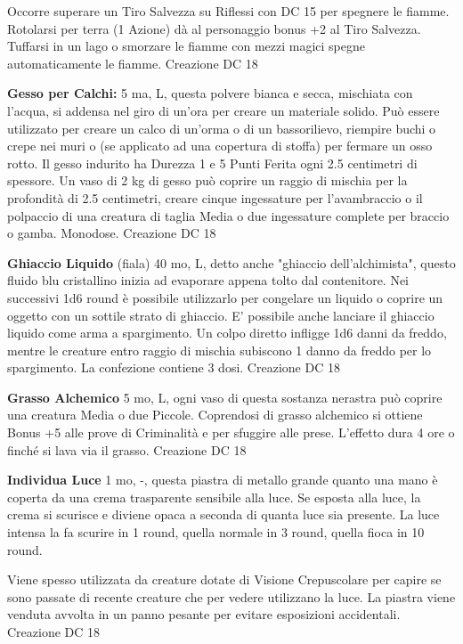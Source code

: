 \documentclass[a4paper,11pt,twoside,openany]{book}
\begin{document}
Occorre superare un Tiro Salvezza su Riflessi con DC 15 per spegnere le fiamme. Rotolarsi per terra (1 Azione) dà al personaggio bonus +2 al Tiro Salvezza. Tuffarsi in un lago o smorzare le fiamme con mezzi magici spegne automaticamente le fiamme. Creazione DC 18

\textbf{Gesso per Calchi:} 5 ma, L, questa polvere bianca e secca, mischiata con l’acqua, si addensa nel giro di un’ora per creare un materiale solido. Può essere utilizzato per creare un calco di un’orma o di un bassorilievo, riempire buchi o crepe nei muri o (se applicato ad una copertura di stoffa) per fermare un osso rotto. Il gesso indurito ha Durezza 1 e 5 Punti Ferita ogni 2.5 centimetri di spessore. Un vaso di 2 kg di gesso può coprire un raggio di mischia per la profondità di 2.5 centimetri, creare cinque ingessature per l’avambraccio o il polpaccio di una creatura di taglia Media o due ingessature complete per braccio o gamba. Monodose. Creazione DC 18

\textbf{Ghiaccio Liquido} (fiala) 40 mo, L, detto anche "ghiaccio dell'alchimista", questo fluido blu cristallino inizia ad evaporare appena tolto dal contenitore. Nei successivi 1d6 round è possibile utilizzarlo per congelare un liquido o coprire un oggetto con un sottile strato di ghiaccio. E' possibile anche lanciare il ghiaccio liquido come arma a spargimento. Un colpo diretto infligge 1d6 danni da freddo, mentre le creature entro raggio di mischia subiscono 1 danno da freddo per lo spargimento. La confezione contiene 3 dosi. Creazione DC 18

\textbf{Grasso Alchemico} 5 mo, L, ogni vaso di questa sostanza nerastra può coprire una creatura Media o due Piccole. Coprendosi di grasso alchemico si ottiene Bonus +5 alle prove di Criminalità e per sfuggire alle prese. L'effetto dura 4 ore o finché si lava via il grasso. Creazione DC 18

\textbf{Individua Luce} 1 mo, -, questa piastra di metallo grande quanto una mano è coperta da una crema trasparente sensibile alla luce. Se esposta alla luce, la crema si scurisce e diviene opaca a seconda di quanta luce sia presente. La luce intensa la fa scurire in 1 round, quella normale in 3 round, quella fioca in 10 round.

Viene spesso utilizzata da creature dotate di Visione Crepuscolare per capire se sono passate di recente creature che per vedere utilizzano la luce. La piastra viene venduta avvolta in un panno pesante per evitare esposizioni accidentali. Creazione DC 18
\end{document}
